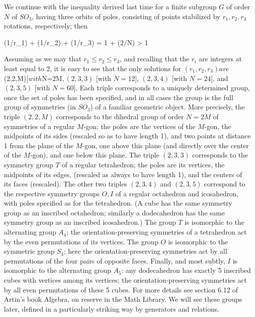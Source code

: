 We continue with the inequality derived last time for a finite subgroup $G$ of order $N$ of $SO_3$, having three orbits of poles, consisting of points stabilized by $r_1,r_2,r_3$ rotations, respectively; then

(1/r_1) + (1/r_2) + (1/r_3) = 1 + (2/N) > 1

Assuming as we may that $r_1\le r_2\le r_3$, and recalling that the $r_i$ are integers at least equal to 2, it is easy to see that the only solutions for $(r_1,r_2,r_3) are $(2,2,M)$ [with $N=2M$, (2,3,3)$ [with $N = 12$], $(2,3,4)$ [with $N = 24$], and $(2,3,5)$ [with $N = 60$].  Each triple corresponds to a uniquely determined group, once the set of poles has been specified, and in all cases the group is the full group of symmetries (in $SO_3$) of a familiar geometric object.  More precisely, the triple
$(2,2,M)$ corresponds to the dihedral group of order $N = 2M$ of symmetries of a regular $M$-gon; the poles are the vertices of the $M$-gon, the midpoints of its sides (rescaled so as to have length 1), and two points at distance 1 from the plane of the $M$-gon, one above this plane (and directly over the center of the $M$-gon), and one below this plane.  The triple $(2,3,3)$ corresponds to the symmetry group $T$ of a regular tetrahedron; the poles are its vertices, the midpoints of its edges, (rescaled as always to have length 1), and the centers of its faces (rescaled).  The other two triples 
$(2,3,4)$ and $(2,3,5)$ correspond to the respective symmetry groups $O,I$ of a regular octahedron and icosahedron, with poles specified as for the tetrahedron.  (A cube has the same symmetry group as an inscribed octahedron; similarly a dodecahedron has the same symmetry group as an inscribed icosahedron.)  The group $T$ is isomorphic to the alternating group $A_4$; the orientation-preserving symmetries of a tetrahedron act by the even permutations of its vertices.  The group $O$ is isomorphic to the symmetric group $S_4$; here the orientation-preserving symmetries act by all permutations of the four pairs of opposite faces.  Finally, and most subtly, $I$ is isomorphic to the alternating group $A_5$:  any dodecahedron has exactly 5 inscribed cubes with vertices among its vertices; the orientation-preserving symmetries act by all even permutations of these 5 cubes.  For more details see section 6.12 of Artin's book Algebra, on reserve in the Math Library.  We will see these groups later, defined in a particularly striking way by generators and relations.

